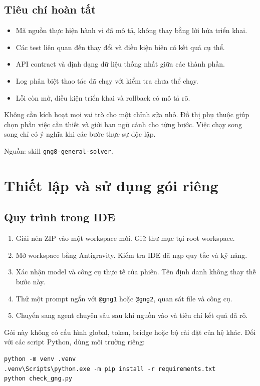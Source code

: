 \documentclass[11pt,a4paper]{article}
\makeatletter
\newcommand{\agent}[1]{\texttt{@gng#1}}
\newcommand{\srcref}[1]{\par{\small\color{muted}Nguồn: #1.}\par}
\newcommand{\code}[1]{\texttt{\detokenize{#1}}}
\makeatother
\begin{document}
\subsection{Tiêu chí hoàn tất}
\begin{itemize}
\item Mã nguồn thực hiện hành vi đã mô tả, không thay bằng lời hứa triển khai.
\item Các test liên quan đến thay đổi và điều kiện biên có kết quả cụ thể.
\item API contract và định dạng dữ liệu thống nhất giữa các thành phần.
\item Log phân biệt thao tác đã chạy với kiểm tra chưa thể chạy.
\item Lỗi còn mở, điều kiện triển khai và rollback có mô tả rõ.
\end{itemize}

Không cần kích hoạt mọi vai trò cho một chỉnh sửa nhỏ. Đồ thị phụ thuộc giúp chọn phần việc cần thiết và giới hạn ngữ cảnh cho từng bước. Việc chạy song song chỉ có ý nghĩa khi các bước thực sự độc lập.
\srcref{skill \texttt{gng8-general-solver}}
\newpage

\section{Thiết lập và sử dụng gói riêng}
\subsection{Quy trình trong IDE}
\begin{enumerate}
\item Giải nén ZIP vào một workspace mới. Giữ thư mục \code{.agents} tại root workspace.
\item Mở workspace bằng Antigravity. Kiểm tra IDE đã nạp quy tắc và kỹ năng.
\item Xác nhận model và công cụ thực tế của phiên. Tên định danh không thay thế bước này.
\item Thử một prompt ngắn với \agent{1} hoặc \agent{2}, quan sát file và công cụ.
\item Chuyển sang agent chuyên sâu sau khi nguồn vào và tiêu chí kết quả đã rõ.
\end{enumerate}

Gói này không có cấu hình global, token, bridge hoặc bộ cài đặt của hệ khác. Đối với các script Python, dùng môi trường riêng:
\begin{verbatim}
python -m venv .venv
.venv\Scripts\python.exe -m pip install -r requirements.txt
python check_gng.py
\end{verbatim}
\end{document}
